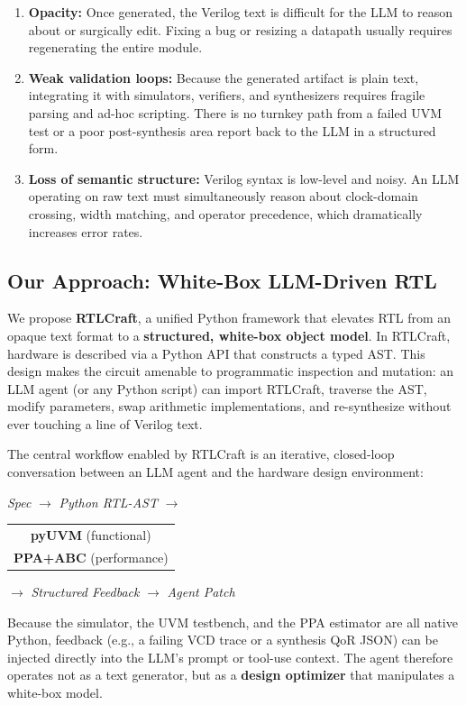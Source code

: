 \documentclass[11pt]{article}
\begin{document}
\begin{enumerate}
    \item \textbf{Opacity:} Once generated, the Verilog text is difficult for the LLM to reason about or surgically edit. Fixing a bug or resizing a datapath usually requires regenerating the entire module.
    \item \textbf{Weak validation loops:} Because the generated artifact is plain text, integrating it with simulators, verifiers, and synthesizers requires fragile parsing and ad-hoc scripting. There is no turnkey path from a failed UVM test or a poor post-synthesis area report back to the LLM in a structured form.
    \item \textbf{Loss of semantic structure:} Verilog syntax is low-level and noisy. An LLM operating on raw text must simultaneously reason about clock-domain crossing, width matching, and operator precedence, which dramatically increases error rates.
\end{enumerate}

\subsection{Our Approach: White-Box LLM-Driven RTL}

We propose \textbf{RTLCraft}, a unified Python framework that elevates RTL from an opaque text format to a \textbf{structured, white-box object model}. In RTLCraft, hardware is described via a Python API that constructs a typed AST. This design makes the circuit amenable to programmatic inspection and mutation: an LLM agent (or any Python script) can import RTLCraft, traverse the AST, modify parameters, swap arithmetic implementations, and re-synthesize without ever touching a line of Verilog text.

The central workflow enabled by RTLCraft is an iterative, closed-loop conversation between an LLM agent and the hardware design environment:

\begin{center}
\textit{Spec} $\rightarrow$ \textit{Python RTL-AST} $\rightarrow$ \begin{tabular}{@{}c@{}}\textbf{pyUVM} (functional) \\ \textbf{PPA+ABC} (performance)\end{tabular} $\rightarrow$ \textit{Structured Feedback} $\rightarrow$ \textit{Agent Patch}
\end{center}

Because the simulator, the UVM testbench, and the PPA estimator are all native Python, feedback (e.g., a failing VCD trace or a synthesis QoR JSON) can be injected directly into the LLM's prompt or tool-use context. The agent therefore operates not as a text generator, but as a \textbf{design optimizer} that manipulates a white-box model.
\end{document}
